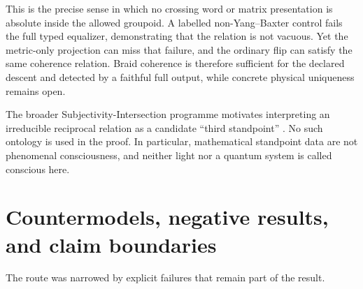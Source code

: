 \documentclass[11pt]{article}
\theoremstyle{definition}
\theoremstyle{remark}
\begin{document}
This is the precise sense in which no crossing word or matrix presentation is absolute inside the allowed groupoid. A labelled non-Yang--Baxter control fails the full typed equalizer, demonstrating that the relation is not vacuous. Yet the metric-only projection can miss that failure, and the ordinary flip can satisfy the same coherence relation. Braid coherence is therefore sufficient for the declared descent and detected by a faithful full output, while concrete physical uniqueness remains open.

The broader Subjectivity-Intersection programme motivates interpreting an irreducible reciprocal relation as a candidate ``third standpoint'' \cite{watanabe2026ontology,watanabe2026sim}. No such ontology is used in the proof. In particular, mathematical standpoint data are not phenomenal consciousness, and neither light nor a quantum system is called conscious here.

\section{Countermodels, negative results, and claim boundaries}

The route was narrowed by explicit failures that remain part of the result.
\end{document}

